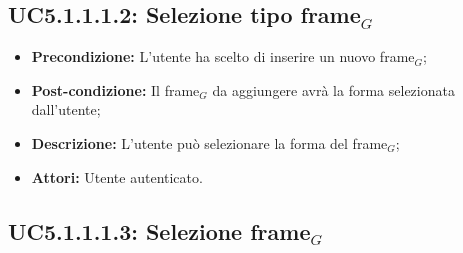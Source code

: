 \subsection{ UC5.1.1.1.2: Selezione tipo frame$_G$ }

\begin{itemize}
	\item \textbf{Precondizione:} L'utente ha scelto di inserire un nuovo frame$_G$;
	\item \textbf{Post-condizione:} Il frame$_G$ da aggiungere avrà la forma selezionata dall'utente;
	\item \textbf{Descrizione:} L'utente può selezionare la forma del frame$_G$;
	\item \textbf{Attori:} Utente autenticato.
\end{itemize}
\subsection{ UC5.1.1.1.3: Selezione frame$_G$}

